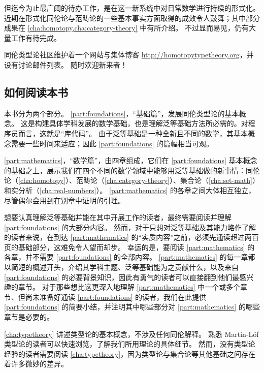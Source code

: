 %
但迄今为止最广阔的待办工作，是在这一新系统中对日常数学进行持续的形式化。
近期在形式化同伦论与范畴论的一些基本事实方面取得的成效令人鼓舞；其中部分成果在 \cref{cha:homotopy,cha:category-theory} 中有所介绍。
不过显而易见，仍有大量工作有待完成。

%

同伦类型论社区维护着一个网站与集体博客 \url{http://homotopytypetheory.org}，并设有讨论邮件列表。
随时欢迎新来者！

\subsection*{如何阅读本书}

本书分为两个部分。
\cref{part:foundations}，``基础篇''，发展同伦类型论的基本概念。
这是构建具体学科发展的数学基础，也是理解泛等基础方法所必需的。对程序员而言，这就是``库代码''。
由于泛等基础是一种全新且不同的数学，其基本概念需要一些时间来适应；因此 \cref{part:foundations} 的篇幅相当可观。

\cref{part:mathematics}，``数学篇''，由四章组成，它们在 \cref{part:foundations} 基本概念的基础之上，展示我们在四个不同的数学领域中能够用泛等基础做的新事情：同伦论（\cref{cha:homotopy}）、范畴论（\cref{cha:category-theory}）、集合论（\cref{cha:set-math}）和实分析（\cref{cha:real-numbers}）。
\cref{part:mathematics} 的各章之间大体相互独立，尽管偶尔会用到在别章中证明的引理。

想要认真理解泛等基础并能在其中开展工作的读者，最终需要阅读并理解 \cref{part:foundations} 的大部分内容。
然而，对于只想对泛等基础及其能力略作了解的读者来说，在到达 \cref{part:mathematics} 的``实质内容''之前，必须先通读超过两百页的基础部分，这难免令人望而却步。
幸运的是，要阅读 \cref{part:mathematics} 的各章，并不需要 \cref{part:foundations} 的全部内容。
\cref{part:mathematics} 的每一章都以简短的概述开头，介绍其学科主题、泛等基础能为之贡献什么，以及来自 \cref{part:foundations} 的必要背景知识，因此有勇气的读者可以直接翻到他们最感兴趣的章节。
对于那些想比这更深入地理解 \cref{part:mathematics} 中一个或多个章节、但尚未准备好通读 \cref{part:foundations} 的读者，我们在此提供 \cref{part:foundations} 的简要小结，并注明其中哪些部分对 \cref{part:mathematics} 的哪些章节是必要的。

\cref{cha:typetheory} 讲述类型论的基本概念，不涉及任何同伦解释。
熟悉 Martin-L\"of 类型论的读者可以快速浏览，了解我们所用理论的具体细节。
然而，没有类型论经验的读者需要阅读 \cref{cha:typetheory}，因为类型论与集合论等其他基础之间存在着许多微妙的差异。


